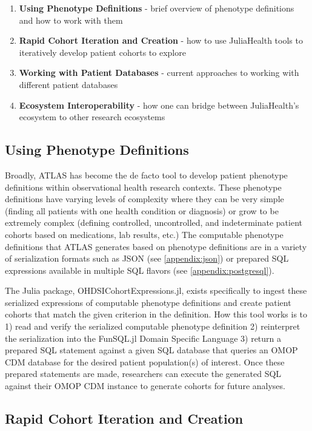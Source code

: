 \documentclass{juliacon}
\begin{document}
\begin{enumerate}
\item \textbf{Using Phenotype Definitions} - brief overview of phenotype definitions and how to work with them
\item \textbf{Rapid Cohort Iteration and Creation} - how to use JuliaHealth tools to iteratively develop patient cohorts to explore
\item \textbf{Working with Patient Databases} - current approaches to working with different patient databases
\item \textbf{Ecosystem Interoperability} - how one can bridge between JuliaHealth's ecosystem to other research ecosystems
\end{enumerate}

\subsection{Using Phenotype Definitions}

Broadly, ATLAS has become the de facto tool to develop patient phenotype definitions within observational health research contexts.
These phenotype definitions have varying levels of complexity where they can be very simple (finding all patients with one health condition or diagnosis) or grow to be extremely complex (defining controlled, uncontrolled, and indeterminate patient cohorts based on medications, lab results, etc.)
The computable phenotype definitions that ATLAS generates based on phenotype definitions are in a variety of serialization formats such as JSON (see \ref{appendix:json}) or prepared SQL expressions available in multiple SQL flavors (see \ref{appendix:postgresql}).

The Julia package, OHDSICohortExpressions.jl, exists specifically to ingest these serialized expressions of computable phenotype definitions and create patient cohorts that match the given criterion in the definition.
How this tool works is to 1) read and verify the serialized computable phenotype definition 2) reinterpret the serialization into the FunSQL.jl Domain Specific Language 3) return a prepared SQL statement against a given SQL database that queries an OMOP CDM database for the desired patient population(s) of interest.
Once these prepared statements are made, researchers can execute the generated SQL against their OMOP CDM instance to generate cohorts for future analyses.

\subsection{Rapid Cohort Iteration and Creation}
\end{document}
